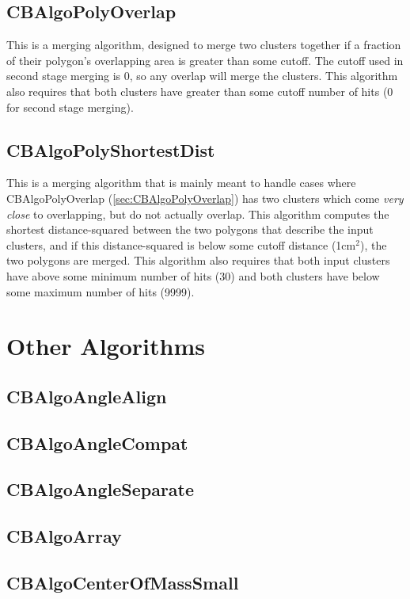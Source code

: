 \documentclass{article}
\begin{document}
\subsection{CBAlgoPolyOverlap}\label{sec:CBAlgoPolyOverlap}
This is a merging algorithm, designed to merge two clusters together if a fraction of their polygon's overlapping area is greater than some cutoff. The cutoff used in second stage merging is 0, so any overlap will merge the clusters. This algorithm also requires that both clusters have greater than some cutoff number of hits (0 for second stage merging).

\subsection{CBAlgoPolyShortestDist}\label{sec:CBAlgoPolyShortestDist}
This is a merging algorithm that is mainly meant to handle cases where CBAlgoPolyOverlap (\autoref{sec:CBAlgoPolyOverlap}) has two clusters which come \textit{very close} to overlapping, but do not actually overlap. This algorithm computes the shortest distance-squared between the two polygons that describe the input clusters, and if this distance-squared is below some cutoff distance (1cm$^2$), the two polygons are merged. This algorithm also requires that both input clusters have above some minimum number of hits (30) and both clusters have below some maximum number of hits (9999).
\section{Other Algorithms}

\subsection{CBAlgoAngleAlign}\label{sec:CBAlgoAngleAlign}
\subsection{CBAlgoAngleCompat}\label{sec:CBAlgoAngleCompat}
\subsection{CBAlgoAngleSeparate}\label{sec:CBAlgoAngleSeparate}
\subsection{CBAlgoArray}\label{sec:CBAlgoArray}
\subsection{CBAlgoCenterOfMassSmall}\label{sec:CBAlgoCenterOfMassSmall}
\end{document}
